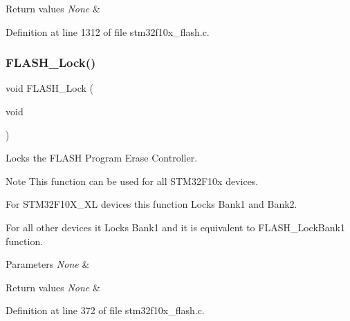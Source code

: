 \begin{DoxyRetVals}{Return values}
{\em None} & \\
\hline
\end{DoxyRetVals}


Definition at line 1312 of file stm32f10x\+\_\+flash.\+c.

\mbox{\label{group___f_l_a_s_h___private___functions_ga46899557353c4312ddbe3f25e65df1d8}} 
\subsubsection{\texorpdfstring{F\+L\+A\+S\+H\+\_\+\+Lock()}{FLASH\_Lock()}}
{\footnotesize\ttfamily void F\+L\+A\+S\+H\+\_\+\+Lock (\begin{DoxyParamCaption}\item[{void}]{ }\end{DoxyParamCaption})}



Locks the F\+L\+A\+SH Program Erase Controller. 

\begin{DoxyNote}{Note}
This function can be used for all S\+T\+M32\+F10x devices.
\begin{DoxyItemize}
\item For S\+T\+M32\+F10\+X\+\_\+\+XL devices this function Locks Bank1 and Bank2.
\item For all other devices it Locks Bank1 and it is equivalent to F\+L\+A\+S\+H\+\_\+\+Lock\+Bank1 function. 
\end{DoxyItemize}
\end{DoxyNote}

\begin{DoxyParams}{Parameters}
{\em None} & \\
\hline
\end{DoxyParams}

\begin{DoxyRetVals}{Return values}
{\em None} & \\
\hline
\end{DoxyRetVals}


Definition at line 372 of file stm32f10x\+\_\+flash.\+c.

